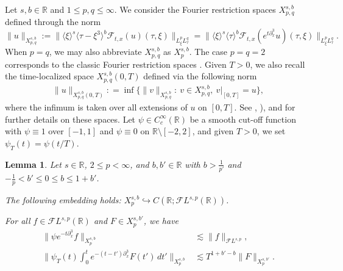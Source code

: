 \documentclass[a4paper,
11pt,  reqno]{amsart}
\newcommand{\jap}[1]{\langle #1 \rangle}
\newcommand{\5}{\textup{V}}
\newcommand{\noi}{\noindent}
\newcommand{\FL}{\mathcal{F} L}
\newcommand{\les}{\lesssim}
\newcommand{\F}{\mathcal{F}}
\newcommand{\dx}{\partial_x}
\newtheorem{lemma}[theorem]{Lemma}
\theoremstyle{remark}
\newcommand{\R}{\mathbb{R}}
\newcommand{\jb}[1]
{\langle #1 \rangle}
\numberwithin{equation}{section}
\numberwithin{theorem}{section}
\begin{document}
		Let $s,b\in \R$ and $1\le p,q \le \infty$. We consider the Fourier restriction spaces $X^{s,b}_{p,q}$ defined through the norm
		\begin{equation}\label{Xsb}
			\| u \|_{X^{s,b}_{p,q}} := \| \jap{\xi}^s \jap{\tau-\xi^3}^b \F_{t,x}(u) (\tau, \xi) \|_{L^p_\xi L^q_\tau}
            =
            \| \jb{\xi}^s \jb{\tau}^b \F_{t,x}(e^{t \dx^3} u ) (\tau, \xi) \|_{L^p_\xi L^q_\tau}. 
		\end{equation}
When $p=q$, we may also abbreviate $X^{s,b}_{p,q}$ as $X^{s,b}_p$. 
		The case $p=q=2$ corresponds to the classic Fourier restriction spaces \cite{bourg1, bourg2}. 
        Given $T>0$, we also recall the time-localized space $X^{s, b}_{p,q} (0,T)$ defined via the following norm
        \begin{align}
            \| u\|_{X^{s, b}_{p,q}(0,T)} : = \inf 
            \big\{ 
            \| v\|_{X^{s, b}_{p,q}} : \ v\in X^{s,b}_{p,q}, \ v\vert_{[0,T]} = u 
            \big\}, 
        \end{align}
        where the infimum is taken over all extensions of $u$ on $[0,T]$. See \cite[Chapter 2.6]{tao_book}, \cite[Chapter 7.4]{linares_ponce_book}), and  \cite{HerrGrunrock_FL} for further details on these spaces. 
        Let  $\psi\in C_c^\infty(\R)$ be a smooth cut-off function with $\psi\equiv 1$ over $[-1,1]$ and $\psi\equiv 0$ on $\R\setminus [-2,2]$, and given $T>0$, we set $\psi_T(t)=\psi(t/T)$.
        
        
        
\begin{lemma}
\label{lem:linear_estimates_qfinite}
			Let $s\in\R$, $2\le p <\infty$, and $b,b'\in\R$ with $b > \frac{1}{p'}$ and $-\frac1p<b' \le 0 \le b \le 1+b'$. 

            
			\noi{\rm(i)} The following embedding holds: $X^{s,b}_{p} \hookrightarrow C(\R;\FL^{s,p}(\R))$. 
            
			\smallskip
			\noi{\rm(ii)} For all $f \in \FL^{s,p}(\R)$ and $F \in X^{s, b'}_p$, we have
			\begin{align}
				\label{lin1_gh}
				\| \psi e^{-t\dx^3} f \|_{X^{s,b}_{p}} &\les \| f \|_{\FL^{s,p}}, 
                \\
				\bigg\| \psi_T (t) \int_0^t e^{-(t-t')\dx^3 } F(t') \, dt' \bigg\|_{X^{s,b}_{p} } 
                &
                \les T^{1+b'-b} \| F \|_{X^{s,b'}_{p}}.
                \label{lin2a_gh}
			\end{align}
			
		\end{lemma}
\end{document}
